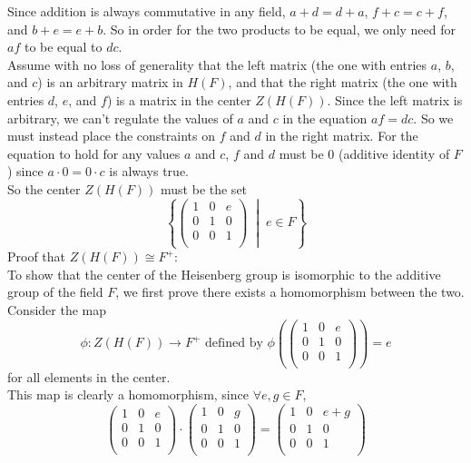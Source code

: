 \documentclass[12pt]{article}
\begin{document}
    Since addition is always commutative in any field,
    $a + d = d + a$, $f + c = c + f$, and $b + e = e + b$.
    So in order for the two products to be equal,
    we only need for $af$ to be equal to $dc$. \\
    Assume with no loss of generality that the left matrix
    (the one with entries $a$, $b$, and $c$)
    is an arbitrary matrix in $H(F)$,
    and that the right matrix 
    (the one with entries $d$, $e$, and $f$)
    is a matrix in the center $Z(H(F))$.
    Since the left matrix is arbitrary, we can't regulate the values
    of $a$ and $c$ in the equation $af = dc$.
    So we must instead place the constraints on $f$ and $d$ in
    the right matrix.
    For the equation to hold for any values $a$ and $c$,
    $f$ and $d$ must be 0 (additive identity of $F$)
    since $a \cdot 0 = 0 \cdot c$ is always true. \\
    So the center $Z(H(F))$ must be the set
    \[ \left\{ \begin{pmatrix}
        1 & 0 & e \\        
        0 & 1 & 0 \\
        0 & 0 & 1 \\
    \end{pmatrix} \; \middle\vert \; e \in F \right\} \]
    Proof that $Z(H(F)) \cong F^+$: \\
    To show that the center of the Heisenberg group is isomorphic
    to the additive group of the field $F$,
    we first prove there exists a homomorphism between the two.
    Consider the map
    \[\phi: Z(H(F)) \to F^+
    \text{ defined by } \phi\left( \begin{pmatrix}
        1 & 0 & e \\        
        0 & 1 & 0 \\
        0 & 0 & 1 \\
    \end{pmatrix} \right) = e \]
    for all elements in the center. \\
    This map is clearly a homomorphism, since $\forall e, g \in F$,
    \[\begin{pmatrix}
        1 & 0 & e \\        
        0 & 1 & 0 \\
        0 & 0 & 1 \\
    \end{pmatrix} \cdot \begin{pmatrix}
        1 & 0 & g \\        
        0 & 1 & 0 \\
        0 & 0 & 1 \\
    \end{pmatrix}
    = \begin{pmatrix}
        1 & 0 & e + g \\        
        0 & 1 & 0 \\
        0 & 0 & 1 \\
    \end{pmatrix}
    \]
\end{document}
